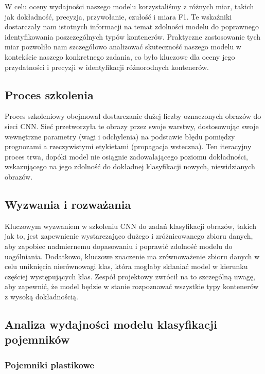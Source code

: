 \documentclass[12pt, a4paper, twoside, openany]{book}
\newcommand{\forceindent}{\leavevmode{\parindent=1.3em\indent}}
\begin{document}
W celu oceny wydajności naszego modelu korzystaliśmy z różnych miar, takich jak dokładność, precyzja, przywołanie, czułość i miara F1. Te wskaźniki dostarczały nam istotnych informacji na temat zdolności modelu do poprawnego identyfikowania poszczególnych typów kontenerów. Praktyczne zastosowanie tych miar pozwoliło nam szczegółowo analizować skuteczność naszego modelu w kontekście naszego konkretnego zadania, co było kluczowe dla oceny jego przydatności i precyzji w identyfikacji różnorodnych kontenerów.

\subsection{Proces szkolenia}
\forceindent Proces szkoleniowy obejmował dostarczanie dużej liczby oznaczonych obrazów do sieci CNN. Sieć przetworzyła te obrazy przez swoje warstwy, dostosowując swoje wewnętrzne parametry (wagi i odchylenia) na podstawie błędu pomiędzy prognozami a rzeczywistymi etykietami (propagacja wsteczna).
Ten iteracyjny proces trwa, dopóki model nie osiągnie zadowalającego poziomu dokładności, wskazującego na jego zdolność do dokładnej klasyfikacji nowych, niewidzianych obrazów.

\subsection{Wyzwania i rozważania}
\forceindent Kluczowym wyzwaniem w szkoleniu CNN do zadań klasyfikacji obrazów, takich jak to, jest zapewnienie wystarczająco dużego i zróżnicowanego zbioru danych, aby zapobiec nadmiernemu dopasowaniu i poprawić zdolność modelu do uogólniania.
Dodatkowo, kluczowe znaczenie ma zrównoważenie zbioru danych w celu uniknięcia nierównowagi klas, która mogłaby skłaniać model w kierunku częściej występujących klas. Zespół projektowy zwrócił na to szczególną uwagę, aby zapewnić, że model będzie w stanie rozpoznawać wszystkie typy kontenerów z wysoką dokładnością.

\subsection{Analiza wydajności modelu klasyfikacji pojemników}

\subsubsection{Pojemniki plastikowe}
\end{document}
